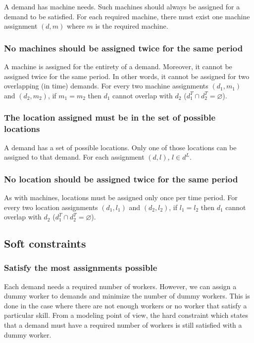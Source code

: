 \documentclass[../thesis.tex]{subfiles}
\begin{document}
A demand has machine needs. Such machines should always be assigned 
for a demand to be satisfied.
For each required machine, there must exist one machine assignment $(d, m)$ where $m$ is the required machine.


\subsubsection{No machines should be assigned twice for the same period}

A machine is assigned for the entirety of a demand. Moreover, it cannot be assigned twice 
for the same period. In other words, it cannot be assigned for two overlapping (in time) demands.
For every two machine assignments $(d_1, m_1)$ and $(d_2, m_2)$, if $m_1 = m_2$ then $d_1$ cannot overlap with $d_2$
($d_1^T \cap d_2^T = \varnothing $).


\subsubsection{The location assigned must be in the set of possible locations}

A demand has a set of possible locations. Only one of those locations can be assigned 
to that demand.
For each assignment $(d, l)$, $l \in d^L$.

\subsubsection{No location should be assigned twice for the same period}

As with machines, locations must be assigned only once per time period.
For every two location assignments $(d_1, l_1)$ and $(d_2, l_2)$, if $l_1 = l_2$ then $d_1$ cannot overlap with $d_2$
($d_1^T \cap d_2^T = \varnothing $).


\subsection{Soft constraints}

\subsubsection{Satisfy the most assignments possible}

Each demand needs a required number of workers. However, we can assign a dummy worker to demands 
and minimize the number of dummy workers. This is done in the case where there are not enough workers
or no worker that satisfy a particular skill. From a modeling point of view, the hard constraint which states that 
a demand must have a required number of workers is still satisfied with a dummy worker.
\end{document}
